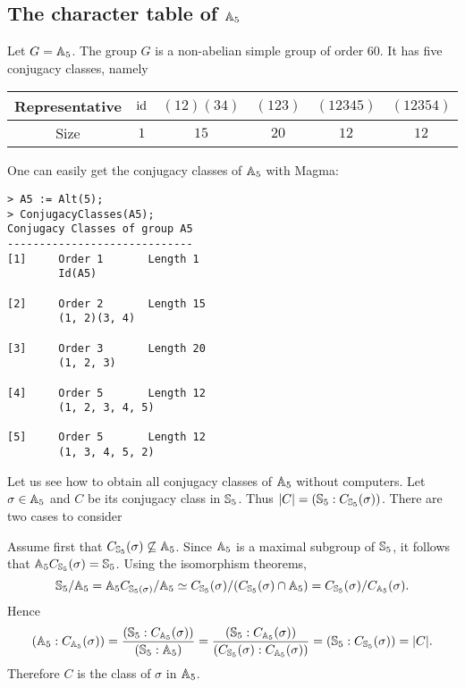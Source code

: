 \subsection{The character table of \texorpdfstring{$\mathbb{A}_5$}{A5}}

Let $G=\mathbb{A}_5$. 
The group $G$ is a non-abelian simple group of order 60. It has five conjugacy classes, namely

\bigskip 
\begin{center}
    \begin{tabular}{c|ccccc}
         Representative & $\operatorname{id}$  & $(12)(34)$ & $(123)$  & $(12345)$ & $(12354)$\\
         \hline 
         Size & $1$ & $15$ & $20$ & $12$ & $12$ \\
    \end{tabular}
\end{center}
\bigskip 

One can easily get the conjugacy classes of 
$\mathbb{A}_5$ with Magma:
\begin{lstlisting}
> A5 := Alt(5);
> ConjugacyClasses(A5);
Conjugacy Classes of group A5
-----------------------------
[1]     Order 1       Length 1
        Id(A5)

[2]     Order 2       Length 15
        (1, 2)(3, 4)

[3]     Order 3       Length 20
        (1, 2, 3)

[4]     Order 5       Length 12
        (1, 2, 3, 4, 5)

[5]     Order 5       Length 12
        (1, 3, 4, 5, 2)    
\end{lstlisting}

Let us see how to obtain all conjugacy classes
of $\mathbb{A}_5$ without computers. Let $\sigma\in\mathbb{A}_5$ and $C$ be its
conjugacy class in $\mathbb{S}_5$. Thus $|C|=(\mathbb{S}_5:C_{\mathbb{S}_5}(\sigma))$. There are two cases to consider

Assume first that $C_{\mathbb{S}_5}(\sigma)\not\subseteq\mathbb{A}_5$. Since $\mathbb{A}_5$ is a maximal subgroup of $\mathbb{S}_5$, it follows that 
$\mathbb{A}_5C_{\mathbb{S}_5}(\sigma)=\mathbb{S}_5$. Using the isomorphism theorems, 
\[
\mathbb{S}_5/\mathbb{A}_5=\mathbb{A}_5C_{\mathbb{S}_5(\sigma)}/\mathbb{A}_5
\simeq C_{\mathbb{S}_5}(\sigma)/(C_{\mathbb{S}_5}(\sigma)\cap\mathbb{A}_5)
=C_{\mathbb{S}_5}(\sigma)/C_{\mathbb{A}_5}(\sigma).
\]
Hence 
\[
(\mathbb{A}_5:C_{\mathbb{A}_5}(\sigma))=\frac{(\mathbb{S}_5:C_{\mathbb{A}_5}(\sigma))}{(\mathbb{S}_5:\mathbb{A}_5)}
=\frac{(\mathbb{S}_5:C_{\mathbb{A}_5}(\sigma))}{(C_{\mathbb{S}_5}(\sigma):C_{\mathbb{A}_5}(\sigma))}
=(\mathbb{S}_5:C_{\mathbb{S}_5}(\sigma))=|C|.
\]
Therefore $C$ is the class of $\sigma$ in $\mathbb{A}_5$. 

